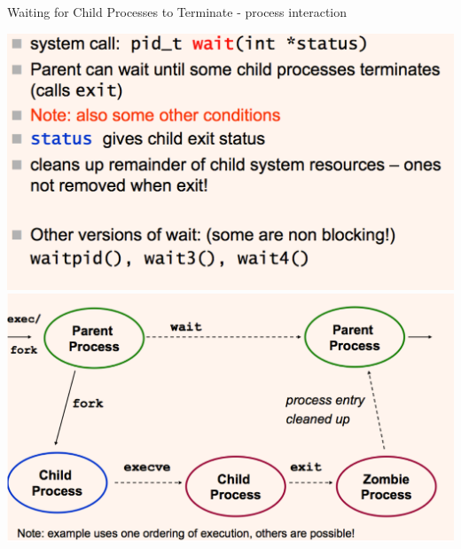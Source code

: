 \documentclass[12pt,a4paper]{article}
\theoremstyle{definition}
\begin{document}
\begin{tcolorbox}
	\textsf{Waiting for Child Processes to Terminate - process interaction}
	
	\includegraphics[scale=0.33]{m1/parentWait1}
	\includegraphics[scale=0.33]{m1/parentWait2}
	\centering
\end{tcolorbox}
\end{document}
